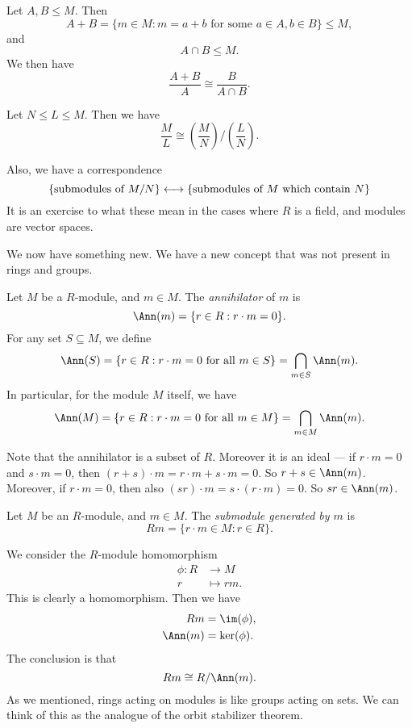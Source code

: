\documentclass[a4paper]{article}
\begin{document}
\begin{thm}
  Let $A, B \leq M$. Then
  \[
    A + B = \{m \in M: m = a + b\text{ for some } a \in A, b \in B\} \leq M,
  \]
  and
  \[
    A \cap B \leq M.
  \]
  We then have
  \[
    \frac{A + B}{A} \cong \frac{B}{A \cap B}.
  \]
\end{thm}

\begin{thm}
  Let $N \leq L \leq M$. Then we have
  \[
    \frac{M}{L} \cong \left(\frac{M}{N}\right)\big/ \left(\frac{L}{N}\right).
  \]
\end{thm}

Also, we have a correspondence
\[
  \{\text{submodules of }M/N\} \longleftrightarrow\{\text{submodules of }M\text{ which contain }N\}\\
\]
It is an exercise to what these mean in the cases where $R$ is a field, and modules are vector spaces.

We now have something new. We have a new concept that was not present in rings and groups.
\begin{defi}[Annihilator]
  Let $M$ be a $R$-module, and $m \in M$. The \emph{annihilator} of $m$ is
  \[
    \Ann(m) = \{r \in R: r \cdot m = 0\}.
  \]
  For any set $S \subseteq M$, we define
  \[
    \Ann(S) = \{r \in R: r \cdot m = 0\text{ for all }m \in S\} = \bigcap_{m \in S} \Ann(m).
  \]
  In particular, for the module $M$ itself, we have
  \[
    \Ann(M) = \{r \in R: r \cdot m = 0\text{ for all }m \in M\} = \bigcap_{m \in M} \Ann(m).
  \]
\end{defi}

Note that the annihilator is a subset of $R$. Moreover it is an ideal --- if $r \cdot m = 0$ and $s \cdot m = 0$, then $(r + s) \cdot m = r \cdot m + s \cdot m = 0$. So $r + s \in \Ann(m)$. Moreover, if $r \cdot m = 0$, then also $(sr) \cdot m = s \cdot (r \cdot m) = 0$. So $sr \in \Ann(m)$.

\begin{defi}
  Let $M$ be an $R$-module, and $m \in M$. The \emph{submodule generated by $m$} is
  \[
    Rm = \{r \cdot m \in M: r \in R\}.
  \]
\end{defi}

We consider the $R$-module homomorphism
\begin{align*}
  \phi: R &\to M\\
  r &\mapsto rm.
\end{align*}
This is clearly a homomorphism. Then we have
\begin{align*}
  Rm &= \im(\phi),\\
  \Ann(m) &= \ker(\phi).
\end{align*}
The conclusion is that
\[
  Rm \cong R/\Ann(m).
\]
As we mentioned, rings acting on modules is like groups acting on sets. We can think of this as the analogue of the orbit stabilizer theorem.
\end{document}

